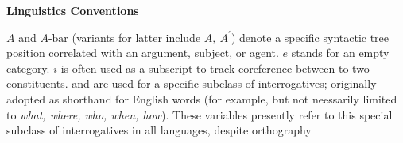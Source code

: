 \documentclass{article}
\begin{document}

 \begin{center}{\bf Linguistics Conventions}\end{center}
\ex $A$ and $A\text{-bar}$ (variants for latter include $ \bar{A}, \ A^{\prime}$) denote a specific syntactic tree position correlated with an argument, subject, or agent.
\ex $e$ stands for an empty category.
\ex $i$ is often used as a subscript to track coreference between to two constituents.
\ex \wh{} and \Wh{} are used for a specific subclass of interrogatives; originally adopted as shorthand for English words (for example, but not neessarily limited to \textsl{what, where, who, when, how}). These variables presently refer to this special subclass of interrogatives in all languages, despite orthography
\end{document}
